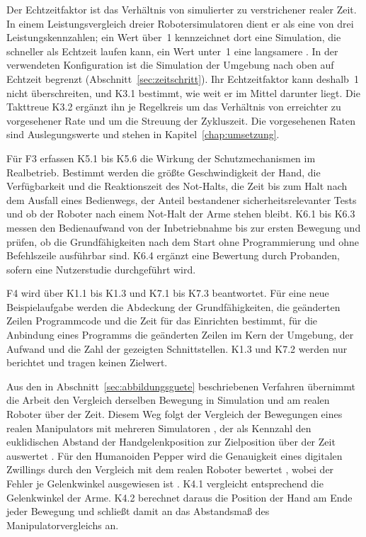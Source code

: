 Der Echtzeitfaktor ist das Verhältnis von simulierter zu verstrichener realer Zeit.
In einem Leistungsvergleich dreier Robotersimulatoren dient er als eine von drei Leistungskennzahlen; ein Wert über~1 kennzeichnet dort eine Simulation, die schneller als Echtzeit laufen kann, ein Wert unter~1 eine langsamere \cite{Pitonakova2018}.
In der verwendeten Konfiguration ist die Simulation der Umgebung nach oben auf Echtzeit begrenzt (Abschnitt~\ref{sec:zeitschritt}).
Ihr Echtzeitfaktor kann deshalb~1 nicht überschreiten, und K3.1 bestimmt, wie weit er im Mittel darunter liegt.
Die Takttreue K3.2 ergänzt ihn je Regelkreis um das Verhältnis von erreichter zu vorgesehener Rate und um die Streuung der Zykluszeit.
Die vorgesehenen Raten sind Auslegungswerte und stehen in Kapitel~\ref{chap:umsetzung}.

Für F3 erfassen K5.1 bis K5.6 die Wirkung der Schutzmechanismen im Realbetrieb.
Bestimmt werden die größte Geschwindigkeit der Hand, die Verfügbarkeit und die Reaktionszeit des Not-Halts, die Zeit bis zum Halt nach dem Ausfall eines Bedienwegs, der Anteil bestandener sicherheitsrelevanter Tests und ob der Roboter nach einem Not-Halt der Arme stehen bleibt.
K6.1 bis K6.3 messen den Bedienaufwand von der Inbetriebnahme bis zur ersten Bewegung und prüfen, ob die Grundfähigkeiten nach dem Start ohne Programmierung und ohne Befehlszeile ausführbar sind.
K6.4 ergänzt eine Bewertung durch Probanden, sofern eine Nutzerstudie durchgeführt wird.

F4 wird über K1.1 bis K1.3 und K7.1 bis K7.3 beantwortet.
Für eine neue Beispielaufgabe werden die Abdeckung der Grundfähigkeiten, die geänderten Zeilen Programmcode und die Zeit für das Einrichten bestimmt, für die Anbindung eines Programms die geänderten Zeilen im Kern der Umgebung, der Aufwand und die Zahl der gezeigten Schnittstellen.
K1.3 und K7.2 werden nur berichtet und tragen keinen Zielwert.

Aus den in Abschnitt~\ref{sec:abbildungsguete} beschriebenen Verfahren übernimmt die Arbeit den Vergleich derselben Bewegung in Simulation und am realen Roboter über der Zeit.
Diesem Weg folgt der Vergleich der Bewegungen eines realen Manipulators mit mehreren Simulatoren \cite{Collins2019}, der als Kennzahl den euklidischen Abstand der Handgelenkposition zur Zielposition über der Zeit auswertet \cite{Collins2019}.
Für den Humanoiden Pepper wird die Genauigkeit eines digitalen Zwillings durch den Vergleich mit dem realen Roboter bewertet \cite{Sekkat2024}, wobei der Fehler je Gelenkwinkel ausgewiesen ist \cite{Sekkat2024}.
K4.1 vergleicht entsprechend die Gelenkwinkel der Arme.
K4.2 berechnet daraus die Position der Hand am Ende jeder Bewegung und schließt damit an das Abstandsmaß des Manipulatorvergleichs an.

